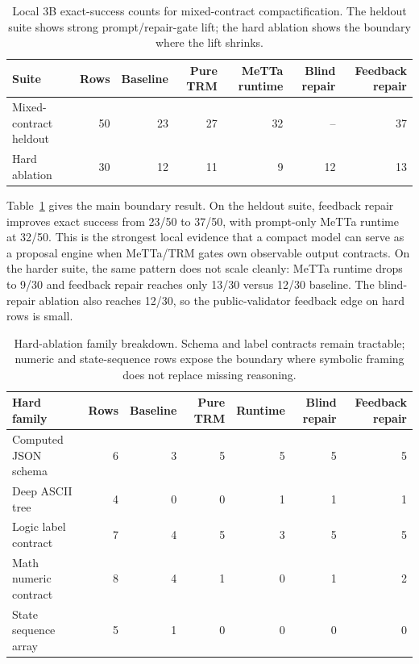 \documentclass[11pt]{article}
\begin{document}
\begin{table}[t]
  \centering
  \small
  \begin{tabular}{lrrrrrr}
    \toprule
    Suite & Rows & Baseline & Pure TRM & MeTTa runtime & Blind repair & Feedback repair \\
    \midrule
    Mixed-contract heldout & 50 & 23 & 27 & 32 & -- & 37 \\
    Hard ablation & 30 & 12 & 11 & 9 & 12 & 13 \\
    \bottomrule
  \end{tabular}
  \caption{Local 3B exact-success counts for mixed-contract compactification. The heldout suite shows strong prompt/repair-gate lift; the hard ablation shows the boundary where the lift shrinks.}
  \label{tab:mixed-contract-boundary}
\end{table}

Table~\ref{tab:mixed-contract-boundary} gives the main boundary result. On the heldout suite, feedback repair improves exact success from 23/50 to 37/50, with prompt-only MeTTa runtime at 32/50. This is the strongest local evidence that a compact model can serve as a proposal engine when MeTTa/TRM gates own observable output contracts. On the harder suite, the same pattern does not scale cleanly: MeTTa runtime drops to 9/30 and feedback repair reaches only 13/30 versus 12/30 baseline. The blind-repair ablation also reaches 12/30, so the public-validator feedback edge on hard rows is small.

\begin{table}[t]
  \centering
  \small
  \begin{tabular}{lrrrrrr}
    \toprule
    Hard family & Rows & Baseline & Pure TRM & Runtime & Blind repair & Feedback repair \\
    \midrule
    Computed JSON schema & 6 & 3 & 5 & 5 & 5 & 5 \\
    Deep ASCII tree & 4 & 0 & 0 & 1 & 1 & 1 \\
    Logic label contract & 7 & 4 & 5 & 3 & 5 & 5 \\
    Math numeric contract & 8 & 4 & 1 & 0 & 1 & 2 \\
    State sequence array & 5 & 1 & 0 & 0 & 0 & 0 \\
    \bottomrule
  \end{tabular}
  \caption{Hard-ablation family breakdown. Schema and label contracts remain tractable; numeric and state-sequence rows expose the boundary where symbolic framing does not replace missing reasoning.}
  \label{tab:hard-family-boundary}
\end{table}
\end{document}

